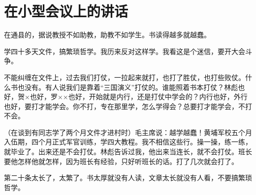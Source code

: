 \section[在小型会议上的讲话（一九六四年）]{在小型会议上的讲话}


在通县的，据说教授不如助教，助教不如学生。书读得越多就越蠢。

学四十多天文件，搞繁琐哲学。我历来反对这样学。我看这是个迷信，要开大会斗争。

不能纠缠在文件上，过去我们打仗，一拉起来就打，也打了胜仗，也打些败仗。什么书也没有。有人说我们是靠着“三国演义”打仗的。谁能照着书本打仗？林彪也好，贺×也好，罗××也好，开始就是内行，还是打仗中学会的？内行也好，外行也好，要打才能学会。你不打，专在那里学，怎么学得会？总要打才能学会，不打不会。

（在谈到有同志学了两个月文件才进村时）毛主席说：越学越蠢！黄埔军校五个月入伍期，四个月正式军官训练，学四大教程。我不相信这些行。操一操，练一练，就毕业了。出来还是不会打仗。林彪告诉过我，他出来当连长，就不会打仗。班长要他怎样他就怎样，因为班长有经验，只好听班长的话。打了几次就会打了。

第二十条太长了，太繁了。书太厚就没有人读，文章太长就没有人看，不要搞繁琐哲学。

